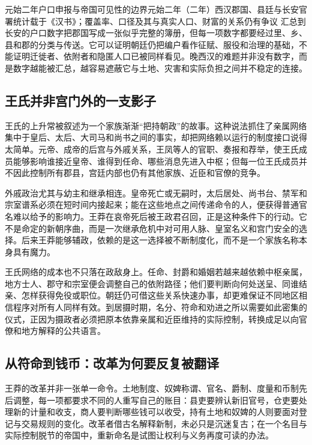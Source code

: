 \begin{event}{元始二年户口申报与帝国可见性的边界}{元始二年（二年）}{西汉郡国、县廷与长安官署}{统计载于《汉书》；覆盖率、口径及其与真实人口、财富的关系仍有争议}
汇总到长安的户口数字把郡国写成一张似乎完整的簿册，但每一项数字都要经过里、乡、县和郡的分类与传送。它可以证明朝廷仍把编户看作征赋、服役和治理的基础，不能证明迁徙者、依附者和隐匿人口已被同样看见。晚西汉的难题并非没有数字，而是数字越能被汇总，越容易遮蔽它与土地、灾害和实际负担之间并不稳定的连接。
\end{event}

\subsection{王氏并非宫门外的一支影子}

王氏的上升常被叙述为一个家族渐渐“把持朝政”的故事。这种说法抓住了亲属网络集中于皇后、太后、大司马和尚书之间的事实，却把网络赖以运行的制度接口说得太简单。元帝、成帝的后宫与外戚关系，王凤等人的官职、奏报和荐举，使王氏成员能够影响谁接近皇帝、谁得到任命、哪些消息先进入中枢；但每一位王氏成员并不因此控制所有郡县，宫廷内部也仍有其他家族、近臣和官僚的竞争。

外戚政治尤其与幼主和继承相连。皇帝死亡或无嗣时，太后居处、尚书台、禁军和宗室谱系必须在短时间内接起来；能在这些地点之间传递命令的人，便获得普通官名难以给予的影响力。王莽在哀帝死后被王政君召回，正是这种条件下的行动。它不是命定的新朝序曲，而是一次继承危机中对可用人脉、皇室名义和宫门安全的选择。后来王莽能够辅政，依赖的是这一选择被不断制度化，而不是一个家族名称本身具有魔力。

王氏网络的成本也不只落在政敌身上。任命、封爵和婚姻若越来越依赖中枢亲属，地方士人、郡守和宗室便会调整自己的依附路径；他们要判断向何处送呈、同谁结亲、怎样获得免役或职位。朝廷仍可借这些关系快速办事，却更难保证不同地区相信程序对所有人同样有效。到居摄时期，名分、符命和劝进之所以需要如此密集的仪式，正因为摄政者必须把原本依靠亲属和近臣维持的实际控制，转换成足以向官僚和地方解释的公共语言。

\subsection{从符命到钱币：改革为何要反复被翻译}

王莽的改革并非一张单一命令。土地制度、奴婢称谓、官名、爵制、度量和币制先后调整，每一项都要求不同的人重写自己的账目：县吏要辨认新旧官号，仓吏要处理新的计量和收支，商人要判断哪些钱可以收受，持有土地和奴婢的人则要面对登记与交易规则的变化。改革者借古名解释新制，未必只是沉迷复古；在一个名目与实际控制脱节的帝国中，重新命名是试图让权利与义务再度可读的办法。

